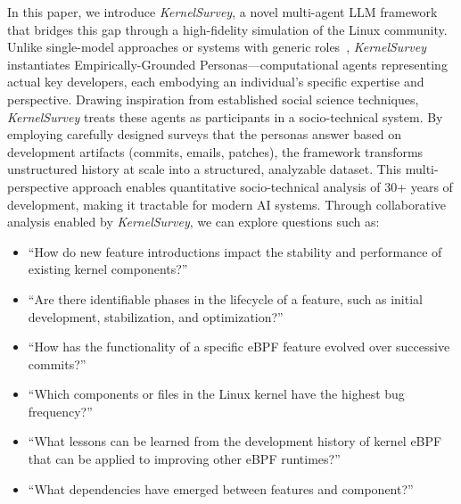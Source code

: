 \documentclass[sigconf,review,anonymous]{acmart}
\newcommand{\sys}{\textit{KernelSurvey}\xspace}
\begin{document}
In this paper, we introduce \sys, a novel multi-agent LLM framework that bridges this gap through a high-fidelity simulation of the Linux community. Unlike single-model approaches or systems with generic roles~\cite{lmase2024,agent4se2024}, \sys instantiates Empirically-Grounded Personas—computational agents representing actual key developers, each embodying an individual's specific expertise and perspective. Drawing inspiration from established social science techniques, \sys treats these agents as participants in a socio-technical system. By employing carefully designed surveys that the personas answer based on development artifacts (commits, emails, patches)\cite{linux,tan2019communicate,schneider2016differentiating}, the framework transforms unstructured history at scale into a structured, analyzable dataset. This multi-perspective approach enables quantitative socio-technical analysis of 30+ years of development, making it tractable for modern AI systems. Through collaborative analysis enabled by \sys, we can explore questions such as:

\begin{itemize}
    \item ``How do new feature introductions impact the stability and performance of existing kernel components?''
    \item ``Are there identifiable phases in the lifecycle of a feature, such as initial development, stabilization, and optimization?''
    \item ``How has the functionality of a specific eBPF feature evolved over successive commits?''
    \item ``Which components or files in the Linux kernel have the highest bug frequency?''
    \item ``What lessons can be learned from the development history of kernel eBPF that can be applied to improving other eBPF runtimes?''
    \item ``What dependencies have emerged between features and component?''
\end{itemize}
\end{document}
